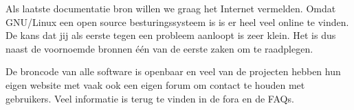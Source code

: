 Als laatste documentatie bron willen we graag het Internet vermelden. Omdat GNU/Linux een open source besturingssysteem is is er heel veel online te vinden. De kans dat jij als eerste tegen een probleem aanloopt is zeer klein. Het is dus naast de voornoemde bronnen \'e\'en van de eerste zaken om te raadplegen.

De broncode van alle software is openbaar en veel van de projecten hebben hun eigen website met vaak ook een eigen forum om contact te houden met gebruikers. Veel informatie is terug te vinden in de fora en de FAQs.

